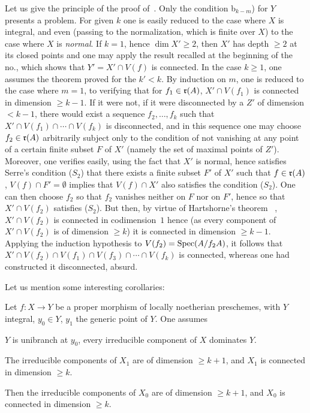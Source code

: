 Let us give the principle of the proof of~. Only the condition b$_{k-m}$) for $Y$ presents a problem. For given $k$ one is easily reduced to the case where $X$ is integral, and even (passing to the normalization, which is finite over $X$) to the case where $X$ is \emph{normal}. If $k=1$, hence $\dim X' \ge 2$, then $X'$ has depth $\ge 2$ at its closed points and one may apply the result recalled at the beginning of the no., which shows that \hbox{$Y'=X'\cap V(f)$} is connected. In the case $k\ge 1$, one assumes the theorem proved for the \hbox{$k'\!<\!k$}. By induction on $m$, one is reduced to the case where $m=1$, \ie to verifying that for $f_1\in\nobreak \mathfrak{r}(A)$, $X'\cap V(f_1)$ is connected in dimension $\ge k-1$. If it were not, \ie if it were disconnected by a $Z'$ of dimension $< k-1$, there would exist a sequence $f_2, \dotsc, f_k$ such that \hbox{$X'\cap V(f_1)\cap\dotsb\cap V(f_k)$} is disconnected, and in this sequence one may choose $f_2\in \mathfrak{r}(A)$ arbitrarily subject only to the condition of not vanishing at any point of a certain finite subset $F$ of $X'$ (namely the set of maximal points of $Z'$). Moreover, one verifies easily, using the fact that $X'$ is normal, hence satisfies Serre's condition ({$S_2$}) that there exists a finite subset $F'$ of $X'$ such that $f\in \mathfrak{r}(A)$, $V(f)\cap F'=\emptyset$ implies that $V(f)\cap X'$ also satisfies the condition ({$S_2$}). One can then choose $f_2$ so that $f_2$ vanishes neither on $F$ nor on $F'$, hence so that $X'\cap V(f_2)$ satisfies ({$S_2$}). But then, by virtue of Hartshorne's theorem ~, $X'\cap V(f_2)$ is connected in codimension~$1$ hence (as every component of $X'\cap V(f_2)$ is of dimension $\ge k$) it is connected in dimension $\ge k-1$. Applying the induction hypothesis to $V(f_2)=\operatorname{Spec}(A/f_2A)$, it follows that $X'\cap V(f_2)\cap V(f_1)\cap V(f_3)\cap \dotsb\cap V(f_k)$ is connected, whereas one had constructed it disconnected, absurd.

Let us mention some interesting corollaries:

\begin{corollary} \label{XIII.2.2}
Let $f\colon X\to Y$ be a proper morphism of locally noetherian preschemes, with $Y$ integral, $y_0\in Y$, $y_1$ the generic point of $Y$. One assumes
\begin{enumeratea}
\item
$Y$ is unibranch at $y_0$, every irreducible component of $X$ dominates $Y$.
\item
The irreducible components of $X_1$ are of dimension $\ge k+1$, and $X_1$ is connected in dimension $\ge k$.
\end{enumeratea}

Then the irreducible components of $X_0$ are of dimension $\ge k+1$, and $X_0$ is connected in dimension $\ge k$.
\end{corollary}

